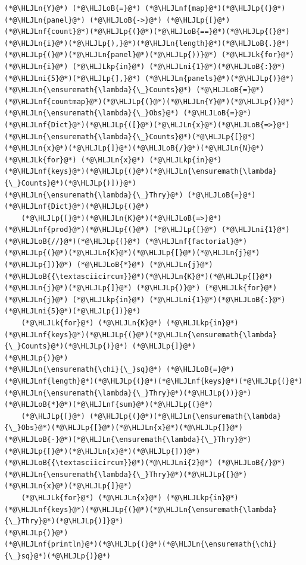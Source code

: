 \documentclass[12pt,a4paper]{article}
\newcommand{\HLJLk}[1]{\textcolor[RGB]{148,91,176}{\textbf{#1}}}
\newcommand{\HLJLkp}[1]{\textcolor[RGB]{148,91,176}{\textbf{#1}}}
\newcommand{\HLJLn}[1]{#1}
\newcommand{\HLJLnf}[1]{\textcolor[RGB]{66,102,213}{#1}}
\newcommand{\HLJLni}[1]{\textcolor[RGB]{59,151,46}{#1}}
\newcommand{\HLJLoB}[1]{\textcolor[RGB]{102,102,102}{\textbf{#1}}}
\newcommand{\HLJLp}[1]{#1}
\begin{document}
\begin{lstlisting}
(*@\HLJLn{Y}@*) (*@\HLJLoB{=}@*) (*@\HLJLnf{map}@*)(*@\HLJLp{(}@*)(*@\HLJLn{panel}@*) (*@\HLJLoB{->}@*) (*@\HLJLp{[}@*)(*@\HLJLnf{count}@*)(*@\HLJLp{(}@*)(*@\HLJLoB{==}@*)(*@\HLJLp{(}@*)(*@\HLJLn{i}@*)(*@\HLJLp{),}@*)(*@\HLJLn{length}@*)(*@\HLJLoB{.}@*)(*@\HLJLp{(}@*)(*@\HLJLn{panel}@*)(*@\HLJLp{))}@*) (*@\HLJLk{for}@*) (*@\HLJLn{i}@*) (*@\HLJLkp{in}@*) (*@\HLJLni{1}@*)(*@\HLJLoB{:}@*)(*@\HLJLni{5}@*)(*@\HLJLp{],}@*) (*@\HLJLn{panels}@*)(*@\HLJLp{)}@*)
(*@\HLJLn{\ensuremath{\lambda}{\_}Counts}@*) (*@\HLJLoB{=}@*) (*@\HLJLnf{countmap}@*)(*@\HLJLp{(}@*)(*@\HLJLn{Y}@*)(*@\HLJLp{)}@*)
(*@\HLJLn{\ensuremath{\lambda}{\_}Obs}@*) (*@\HLJLoB{=}@*) (*@\HLJLnf{Dict}@*)(*@\HLJLp{([}@*)(*@\HLJLn{x}@*)(*@\HLJLoB{=>}@*)(*@\HLJLn{\ensuremath{\lambda}{\_}Counts}@*)(*@\HLJLp{[}@*)(*@\HLJLn{x}@*)(*@\HLJLp{]}@*)(*@\HLJLoB{/}@*)(*@\HLJLn{N}@*) (*@\HLJLk{for}@*) (*@\HLJLn{x}@*) (*@\HLJLkp{in}@*) (*@\HLJLnf{keys}@*)(*@\HLJLp{(}@*)(*@\HLJLn{\ensuremath{\lambda}{\_}Counts}@*)(*@\HLJLp{)])}@*)
(*@\HLJLn{\ensuremath{\lambda}{\_}Thry}@*) (*@\HLJLoB{=}@*) (*@\HLJLnf{Dict}@*)(*@\HLJLp{(}@*)
	(*@\HLJLp{[}@*)(*@\HLJLn{K}@*)(*@\HLJLoB{=>}@*) (*@\HLJLnf{prod}@*)(*@\HLJLp{(}@*) (*@\HLJLp{[}@*) (*@\HLJLni{1}@*)(*@\HLJLoB{//}@*)(*@\HLJLp{(}@*) (*@\HLJLnf{factorial}@*)(*@\HLJLp{(}@*)(*@\HLJLn{K}@*)(*@\HLJLp{[}@*)(*@\HLJLn{j}@*)(*@\HLJLp{])}@*) (*@\HLJLoB{*}@*) (*@\HLJLn{j}@*)(*@\HLJLoB{{\textasciicircum}}@*)(*@\HLJLn{K}@*)(*@\HLJLp{[}@*)(*@\HLJLn{j}@*)(*@\HLJLp{]}@*) (*@\HLJLp{)}@*) (*@\HLJLk{for}@*) (*@\HLJLn{j}@*) (*@\HLJLkp{in}@*) (*@\HLJLni{1}@*)(*@\HLJLoB{:}@*)(*@\HLJLni{5}@*)(*@\HLJLp{])}@*) 
	(*@\HLJLk{for}@*) (*@\HLJLn{K}@*) (*@\HLJLkp{in}@*) (*@\HLJLnf{keys}@*)(*@\HLJLp{(}@*)(*@\HLJLn{\ensuremath{\lambda}{\_}Counts}@*)(*@\HLJLp{)}@*) (*@\HLJLp{]}@*)
(*@\HLJLp{)}@*)
(*@\HLJLn{\ensuremath{\chi}{\_}sq}@*) (*@\HLJLoB{=}@*) (*@\HLJLnf{length}@*)(*@\HLJLp{(}@*)(*@\HLJLnf{keys}@*)(*@\HLJLp{(}@*)(*@\HLJLn{\ensuremath{\lambda}{\_}Thry}@*)(*@\HLJLp{))}@*)(*@\HLJLoB{*}@*)(*@\HLJLnf{sum}@*)(*@\HLJLp{(}@*)
	(*@\HLJLp{[}@*) (*@\HLJLp{(}@*)(*@\HLJLn{\ensuremath{\lambda}{\_}Obs}@*)(*@\HLJLp{[}@*)(*@\HLJLn{x}@*)(*@\HLJLp{]}@*)(*@\HLJLoB{-}@*)(*@\HLJLn{\ensuremath{\lambda}{\_}Thry}@*)(*@\HLJLp{[}@*)(*@\HLJLn{x}@*)(*@\HLJLp{])}@*)(*@\HLJLoB{{\textasciicircum}}@*)(*@\HLJLni{2}@*) (*@\HLJLoB{/}@*) (*@\HLJLn{\ensuremath{\lambda}{\_}Thry}@*)(*@\HLJLp{[}@*)(*@\HLJLn{x}@*)(*@\HLJLp{]}@*)
	(*@\HLJLk{for}@*) (*@\HLJLn{x}@*) (*@\HLJLkp{in}@*) (*@\HLJLnf{keys}@*)(*@\HLJLp{(}@*)(*@\HLJLn{\ensuremath{\lambda}{\_}Thry}@*)(*@\HLJLp{)]}@*)
(*@\HLJLp{)}@*)
(*@\HLJLnf{println}@*)(*@\HLJLp{(}@*)(*@\HLJLn{\ensuremath{\chi}{\_}sq}@*)(*@\HLJLp{)}@*)
\end{lstlisting}
\end{document}
